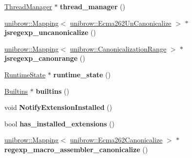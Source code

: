 \begin{DoxyCompactItemize}
\item 
\hyperlink{classv8_1_1internal_1_1_thread_manager}{Thread\+Manager} $\ast$ {\bfseries thread\+\_\+manager} ()\hypertarget{classv8_1_1internal_1_1_isolate_aabc2be46fe8930ab6f44538d1eca456b}{}\label{classv8_1_1internal_1_1_isolate_aabc2be46fe8930ab6f44538d1eca456b}

\item 
\hyperlink{classunibrow_1_1_mapping}{unibrow\+::\+Mapping}$<$ \hyperlink{structunibrow_1_1_ecma262_un_canonicalize}{unibrow\+::\+Ecma262\+Un\+Canonicalize} $>$ $\ast$ {\bfseries jsregexp\+\_\+uncanonicalize} ()\hypertarget{classv8_1_1internal_1_1_isolate_abb16bd94a89f5b53f63733cd88268dd1}{}\label{classv8_1_1internal_1_1_isolate_abb16bd94a89f5b53f63733cd88268dd1}

\item 
\hyperlink{classunibrow_1_1_mapping}{unibrow\+::\+Mapping}$<$ \hyperlink{structunibrow_1_1_canonicalization_range}{unibrow\+::\+Canonicalization\+Range} $>$ $\ast$ {\bfseries jsregexp\+\_\+canonrange} ()\hypertarget{classv8_1_1internal_1_1_isolate_a3c7039fefe33dda66e6029c8d46cdef1}{}\label{classv8_1_1internal_1_1_isolate_a3c7039fefe33dda66e6029c8d46cdef1}

\item 
\hyperlink{classv8_1_1internal_1_1_runtime_state}{Runtime\+State} $\ast$ {\bfseries runtime\+\_\+state} ()\hypertarget{classv8_1_1internal_1_1_isolate_a22f364d364fb4d61f68aa25f06951305}{}\label{classv8_1_1internal_1_1_isolate_a22f364d364fb4d61f68aa25f06951305}

\item 
\hyperlink{classv8_1_1internal_1_1_builtins}{Builtins} $\ast$ {\bfseries builtins} ()\hypertarget{classv8_1_1internal_1_1_isolate_a6cb0edf57f829ea37a9a48a3e6bc007d}{}\label{classv8_1_1internal_1_1_isolate_a6cb0edf57f829ea37a9a48a3e6bc007d}

\item 
void {\bfseries Notify\+Extension\+Installed} ()\hypertarget{classv8_1_1internal_1_1_isolate_ad5d9dd051fe77c6320e22521c8a71a1d}{}\label{classv8_1_1internal_1_1_isolate_ad5d9dd051fe77c6320e22521c8a71a1d}

\item 
bool {\bfseries has\+\_\+installed\+\_\+extensions} ()\hypertarget{classv8_1_1internal_1_1_isolate_a250bee1953bc5af406e1178c175c7912}{}\label{classv8_1_1internal_1_1_isolate_a250bee1953bc5af406e1178c175c7912}

\item 
\hyperlink{classunibrow_1_1_mapping}{unibrow\+::\+Mapping}$<$ \hyperlink{structunibrow_1_1_ecma262_canonicalize}{unibrow\+::\+Ecma262\+Canonicalize} $>$ $\ast$ {\bfseries regexp\+\_\+macro\+\_\+assembler\+\_\+canonicalize} ()\hypertarget{classv8_1_1internal_1_1_isolate_ac2eb3ba336b107b317155072ed447f1b}{}\label{classv8_1_1internal_1_1_isolate_ac2eb3ba336b107b317155072ed447f1b}


\end{DoxyCompactItemize}
